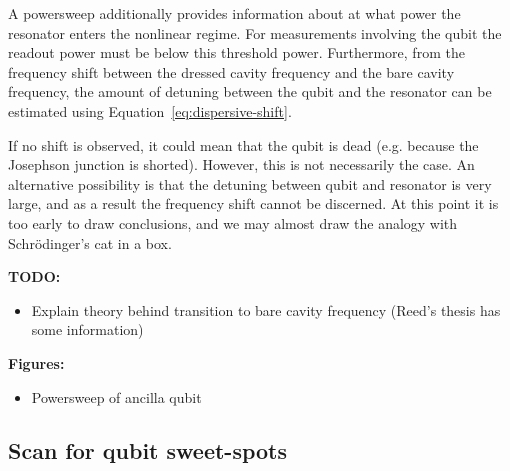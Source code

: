         A powersweep additionally provides information about at what power the resonator enters the nonlinear regime. For measurements involving the qubit the readout power must be below this threshold power. Furthermore, from the frequency shift between the dressed cavity frequency and the bare cavity frequency, the amount of detuning between the qubit and the resonator can be estimated using Equation~\ref{eq:dispersive-shift}.

        If no shift is observed, it could mean that the qubit is dead (e.g. because the Josephson junction is shorted). However, this is not necessarily the case. An alternative possibility is that the detuning between qubit and resonator is very large, and as a result the frequency shift cannot be discerned. At this point it is too early to draw conclusions, and we may almost draw the analogy with Schr\"odinger's cat in a box.

        \textbf{TODO:}
        \begin{itemize}
          \item Explain theory behind transition to bare cavity frequency (Reed's thesis has some information)
        \end{itemize}

        \textbf{Figures:}
        \begin{itemize}
          \item Powersweep of ancilla qubit
        \end{itemize}

      \subsection{Scan for qubit sweet-spots}

